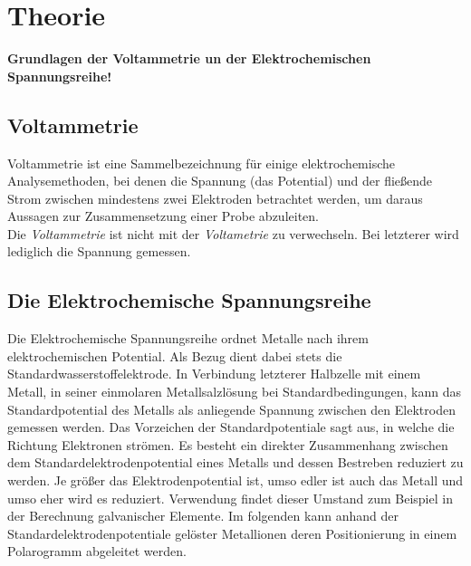 \section{Theorie}
\label{sec:theorie}
\textbf{Grundlagen der Voltammetrie un der Elektrochemischen Spannungsreihe!}\\
\subsection{Voltammetrie}
Voltammetrie ist eine Sammelbezeichnung für einige elektrochemische Analysemethoden, bei denen die Spannung (das Potential) und der fließende Strom zwischen mindestens zwei Elektroden betrachtet werden, um daraus Aussagen zur Zusammensetzung einer Probe abzuleiten.\\
Die \textit{Voltammetrie} ist nicht mit der \textit{Voltametrie} zu verwechseln. Bei letzterer wird lediglich die Spannung gemessen.
\subsection{Die Elektrochemische Spannungsreihe}


Die Elektrochemische Spannungsreihe ordnet Metalle nach ihrem elektrochemischen Potential. Als Bezug dient dabei stets die Standardwasserstoffelektrode. In Verbindung letzterer Halbzelle mit einem Metall, in seiner einmolaren Metallsalzlösung bei Standardbedingungen, kann das Standardpotential des Metalls als anliegende Spannung zwischen den Elektroden gemessen werden. Das Vorzeichen der Standardpotentiale sagt aus, in welche die Richtung Elektronen strömen. Es besteht ein direkter Zusammenhang zwischen dem Standardelektrodenpotential eines Metalls und dessen Bestreben reduziert zu werden. Je größer das Elektrodenpotential ist, umso edler ist auch das Metall und umso eher wird es reduziert. Verwendung findet dieser Umstand zum Beispiel in der Berechnung galvanischer Elemente. Im folgenden kann anhand der Standardelektrodenpotentiale gelöster Metallionen deren Positionierung in einem Polarogramm abgeleitet werden.\cite{spannungsreihe}\\

\vline

